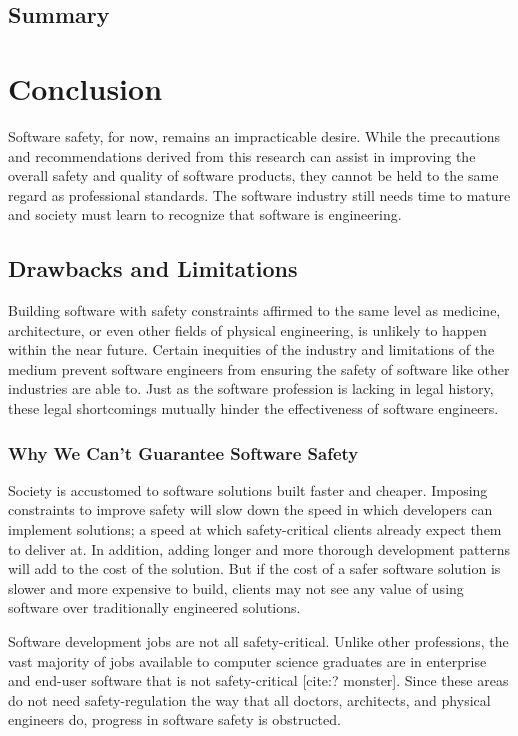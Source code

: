 \documentclass[12pt]{report}
\begin{document}
\section{Summary} 

\chapter{Conclusion}  
Software safety, for now, remains an impracticable desire. While the precautions and recommendations derived from this research can assist in improving the overall safety and quality of software products, they cannot be held to the same regard as professional standards. The software industry still needs time to mature and society must learn to recognize that software is engineering.  

\section{Drawbacks and Limitations}  
Building software with safety constraints affirmed to the same level as medicine, architecture, or even other fields of physical engineering, is unlikely to happen within the near future. Certain inequities of the industry and limitations of the medium prevent software engineers from ensuring the safety of software like other industries are able to.  
Just as the software profession is lacking in legal history, these legal shortcomings mutually hinder the effectiveness of software engineers.  

\subsection{Why We Can't Guarantee Software Safety}  
Society is accustomed to software solutions built faster and cheaper. Imposing constraints to improve safety will slow down the speed in which developers can implement solutions; a speed at which safety-critical clients already expect them to deliver at. In addition, adding longer and more thorough development patterns will add to the cost of the solution. But if the cost of a safer software solution is slower and more expensive to build, clients may not see any value of using software over traditionally engineered solutions. 

Software development jobs are not all safety-critical. Unlike other professions, the vast majority of jobs available to computer science graduates are in enterprise and end-user software that is not safety-critical [cite:? monster]. Since these areas do not need safety-regulation the way that all doctors, architects, and physical engineers do, progress in software safety is obstructed.  
\end{document}

